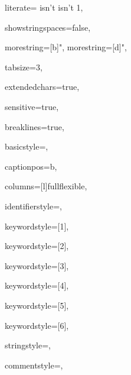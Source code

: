 {%
literate=
	{isn't }{{{\ttfamily\ifelec\color{dkgreen}\fi isn't }}}1,


showstringspaces=false,

morestring=[b]",
morestring=[d]",

tabsize=3,

extendedchars=true,

sensitive=true,

breaklines=true,

basicstyle=\ttfamily,

captionpos=b,

columns=[l]fullflexible,

identifierstyle={\ttfamily\ifelec\color{black}\fi},

keywordstyle=[1]{\ttfamily\ifelec\color{dkviolet}\fi},

keywordstyle=[2]{\ttfamily\ifelec\color{dkgreen}\fi},

keywordstyle=[3]{\ttfamily\ifelec\color{lightblue}\fi},

keywordstyle=[4]{\ttfamily\ifelec\color{dkblue}\fi},

keywordstyle=[5]{\ttfamily\ifelec\color{red}\fi},


keywordstyle=[6]{\ttfamily\ifelec\color{dkpink}\fi},

stringstyle=\ttfamily,

commentstyle=\rmfamily,

}
